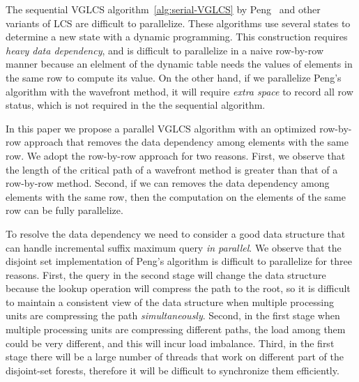 The sequential VGLCS algorithm~\ref{alg:serial-VGLCS} by
Peng~\cite{Peng2011TheLC} and other variants of LCS are difficult to
parallelize.  These algorithms use several states to determine a new
state with a dynamic programming.  This construction requires {\em
  heavy data dependency}, and is difficult to parallelize in a naive
row-by-row manner because an elelment of the dynamic table needs the
values of elements in the same row to compute its value.  On the other
hand, if we parallelize Peng's algorithm with the wavefront method, it
will require {\em extra space} to record all row status, %
which is not required in the the sequential algorithm.





In this paper we propose a parallel VGLCS algorithm with an optimized
row-by-row approach that removes the data dependency among elements
with the same row.  We adopt the row-by-row approach for two reasons.
First, we observe that the length of the critical path of a wavefront
method is greater than that of a row-by-row method.  Second, if we can
removes the data dependency among elements with the same row, then the
computation on the elements of the same row can be fully parallelize.

To resolve the data dependency we need to consider a good data
structure that can handle incremental suffix maximum query {\em in
  parallel}.  We observe that the disjoint set implementation of
Peng's algorithm is difficult to parallelize for three reasons.
First, the query in the second stage will change the data structure
because the lookup operation will compress the path to the root, so it
is difficult to maintain a consistent view of the data structure when
multiple processing units are compressing the path {\em
  simultaneously}.  Second, in the first stage when multiple
processing units are compressing different paths, the load among them
could be very different, and this will incur load imbalance. Third, in
the first stage there will be a large number of threads that work on
different part of the disjoint-set forests, therefore it will be
difficult to synchronize them efficiently.

